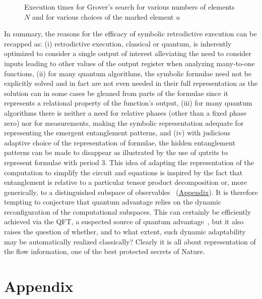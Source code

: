 \documentclass[aps,prl,twocolumn,superscriptaddress,floatfix,notitlepage]{revtex4-2}
\begin{document}
\begin{figure}[!]
\caption{\label{fig:grover}Execution times for Grover's search for various numbers of elements $N$ and for various choices of the marked element $u$}
\end{figure}
In summary, the reasons for the efficacy of symbolic retrodictive execution can be recapped as: (i) retrodictive execution, classical or quantum, is inherently optimized to consider a single output of interest alleviating the need to consider inputs leading to other values of the output register when analyzing many-to-one functions, (ii) for many quantum algorithms, the symbolic formulae need not be explicitly solved and in fact are not even needed in their full representation as the solution can in some cases be gleaned from parts of the formulae since it represents a relational property of the function's output, (iii) for many quantum algorithms there is neither a need for relative phases (other than a fixed phase zero) nor for measurements, making the symbolic representation adequate for representing the emergent entanglement patterns, and (iv) with judicious adaptive choice of the representation of formulae, the hidden entanglement patterns can be made to disappear as illustrated by the use of qutrits to represent formulae with period 3. This idea of adapting the representation of the computation to simplify
the circuit and equations is inspired by the fact that entanglement is
relative to a particular tensor product decomposition or, more generically, 
to a distinguished subspace of observables~\cite{GE2004} (\hyperref[sec:Methods]{Appendix}). It is therefore
tempting to conjecture that quantum advantage relies on the dynamic reconfiguration
of the computational subspaces. This can certainly be efficiently achieved via the QFT, 
a suspected source of quantum advantage~\cite{haduniv}, 
but it also raises the question of whether, and to what extent, such dynamic
adaptability may be automatically realized classically? Clearly it is all about representation of the flow 
information, one of the best protected secrets of Nature. 

\vspace*{-0.5cm}
\section*{Appendix}\label{sec:Methods}
\end{document}

